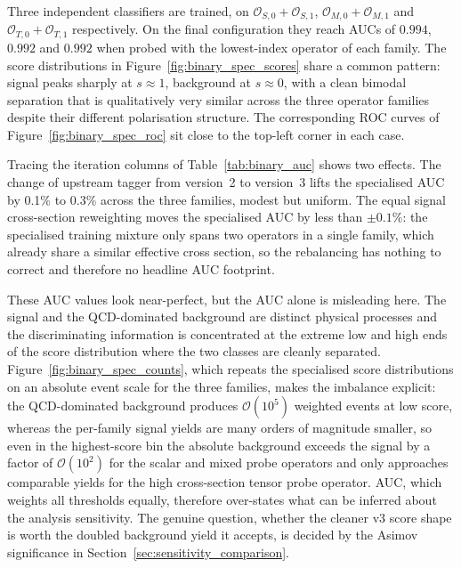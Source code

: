 Three independent classifiers are trained, on $\mathcal{O}_{S,0}+\mathcal{O}_{S,1}$, $\mathcal{O}_{M,0}+\mathcal{O}_{M,1}$ and $\mathcal{O}_{T,0}+\mathcal{O}_{T,1}$ respectively. On the final configuration they reach AUCs of $0.994$, $0.992$ and $0.992$ when probed with the lowest-index operator of each family. The score distributions in Figure~\ref{fig:binary_spec_scores} share a common pattern: signal peaks sharply at $s\approx1$, background at $s\approx0$, with a clean bimodal separation that is qualitatively very similar across the three operator families despite their different polarisation structure. The corresponding ROC curves of Figure~\ref{fig:binary_spec_roc} sit close to the top-left corner in each case.

Tracing the iteration columns of Table~\ref{tab:binary_auc} shows two effects. The change of upstream tagger from version~2 to version~3 lifts the specialised AUC by 0.1\% to 0.3\% across the three families, modest but uniform. The equal signal cross-section reweighting moves the specialised AUC by less than $\pm 0.1\%$: the specialised training mixture only spans two operators in a single family, which already share a similar effective cross section, so the rebalancing has nothing to correct and therefore no headline AUC footprint.

These AUC values look near-perfect, but the AUC alone is misleading here. The signal and the QCD-dominated background are distinct physical processes and the discriminating information is concentrated at the extreme low and high ends of the score distribution where the two classes are cleanly separated. Figure~\ref{fig:binary_spec_counts}, which repeats the specialised score distributions on an absolute event scale for the three families, makes the imbalance explicit: the QCD-dominated background produces $\mathcal{O}(10^5)$ weighted events at low score, whereas the per-family signal yields are many orders of magnitude smaller, so even in the highest-score bin the absolute background exceeds the signal by a factor of $\mathcal{O}(10^2)$ for the scalar and mixed probe operators and only approaches comparable yields for the high cross-section tensor probe operator. AUC, which weights all thresholds equally, therefore over-states what can be inferred about the analysis sensitivity. The genuine question, whether the cleaner v3 score shape is worth the doubled background yield it accepts, is decided by the Asimov significance in Section~\ref{sec:sensitivity_comparison}.

